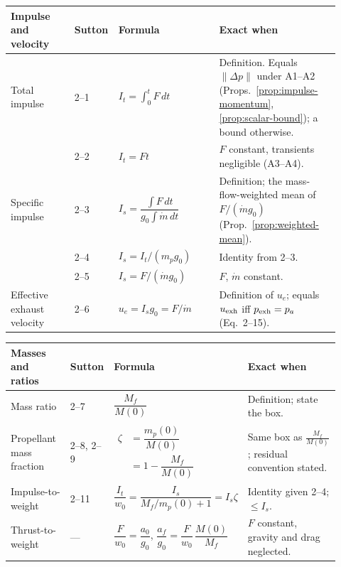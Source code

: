 \begin{center}\small
\renewcommand{\arraystretch}{1.35}
\begin{tabular}{@{}p{0.19\linewidth}p{0.07\linewidth}p{0.30\linewidth}p{0.36\linewidth}@{}}
\hline
Impulse and velocity & Sutton & Formula & Exact when \\
\hline
Total impulse & 2--1 & $I_t=\int_0^{t}F\,dt$ &
 Definition. Equals $\lVert\Delta p\rVert$ under A1--A2
 (Props.~\ref{prop:impulse-momentum}, \ref{prop:scalar-bound}); a bound
 otherwise. \\
 & 2--2 & $I_t=Ft$ & $F$ constant, transients negligible (A3--A4). \\
Specific impulse & 2--3 & $I_s=\dfrac{\int F\,dt}{g_0\int\dot m\,dt}$ &
 Definition; the mass-flow-weighted mean of $F/(\dot mg_0)$
 (Prop.~\ref{prop:weighted-mean}). \\
 & 2--4 & $I_s=I_t/(m_pg_0)$ & Identity from 2--3. \\
 & 2--5 & $I_s=F/(\dot mg_0)$ & $F$, $\dot m$ constant. \\
Effective exhaust velocity & 2--6 & $u_e=I_sg_0=F/\dot m$ &
 Definition of $u_e$; equals $u_{\rm exh}$ iff $p_{\rm exh}=p_a$ (Eq.~2--15). \\
\hline
\end{tabular}
\end{center}

\begin{center}\small
\renewcommand{\arraystretch}{1.35}
\begin{tabular}{@{}p{0.19\linewidth}p{0.07\linewidth}p{0.30\linewidth}p{0.36\linewidth}@{}}
\hline
Masses and ratios & Sutton & Formula & Exact when \\
\hline
Mass ratio & 2--7 & $\dfrac{M_f}{M(0)}$ & Definition; state the box. \\
Propellant mass fraction & 2--8, 2--9 & $\begin{aligned}\zeta&=\dfrac{m_p(0)}{M(0)}\\&=1-\dfrac{M_f}{M(0)}\end{aligned}$ &
 Same box as $\frac{M_f}{M(0)}$; residual convention stated. \\
Impulse-to-weight & 2--11 & $\dfrac{I_t}{w_0}=\dfrac{I_s}{M_f/m_p(0)+1}=I_s\zeta$ &
 Identity given 2--4; $\le I_s$. \\
Thrust-to-weight & --- & $\dfrac{F}{w_0}=\dfrac{a_0}{g_0}$,\quad
 $\dfrac{a_f}{g_0}=\dfrac{F}{w_0}\,\dfrac{M(0)}{M_f}$ &
 $F$ constant, gravity and drag neglected. \\
\hline
\end{tabular}
\end{center}
